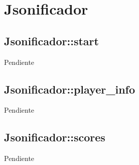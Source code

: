 \documentclass[a4paper,10pt,twoside]{article}
\begin{document}
\section{Jsonificador}


\subsection{Jsonificador::start}

Pendiente


\subsection{Jsonificador::player\_info}

Pendiente


\subsection{Jsonificador::scores}

Pendiente
\end{document}
